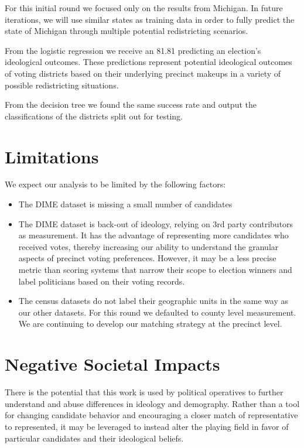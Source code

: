 \documentclass{article}
\begin{document}
For this initial round we focused only on the results from Michigan. 
In future iterations, we will use similar states as training data
in order to fully predict the state of Michigan through multiple
potential redistricting scenarios.

From the logistic regression we receive an 81.81%
predicting an election's ideological outcomes. These predictions
represent potential ideological outcomes of voting districts
based on their underlying precinct makeups in a variety of possible
redistricting situations.

From the decision tree we found the same success rate and output
the classifications of the districts split out for testing.


\section{Limitations}

We expect our analysis to be limited by the following factors:

\begin{itemize}

\item The DIME dataset is missing a small number of candidates

\item The DIME dataset is back-out of ideology, relying on 3rd
party contributors as measurement. It has the advantage of
representing more candidates who received votes, thereby increasing
our ability to understand the granular aspects of precinct voting
preferences. However, it may be a less precise metric than scoring
systems that narrow their scope to election winners and label
politicians based on their voting records.

\item The census datasets do not label their geographic units 
in the same way as our other datasets. For this round we defaulted
to county level measurement. We are continuing to develop our 
matching strategy at the precinct level.
\end{itemize}

\section{Negative Societal Impacts}

There is the potential that this work is used by political operatives to
further understand and abuse differences in ideology and demography. Rather
than a tool for changing candidate behavior and encouraging a closer match of
representative to represented, it may be leveraged to instead alter the playing
field in favor of particular candidates and their ideological beliefs.
\end{document}

